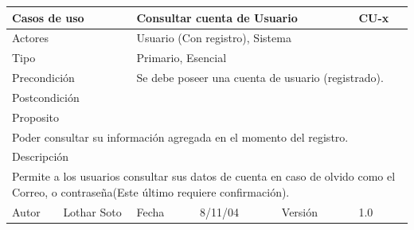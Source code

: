 \documentclass{article}
\begin{document}
\begin{table}[h]
\begin{tabular}{|l|l|l|l|l|l|}
\hline
\multicolumn{2}{|p{2cm}|}{Casos de uso}  & \multicolumn{3}{p{7cm}|}{Consultar cuenta de Usuario} & CU-x \\
\hline
\multicolumn{2}{|p{2cm}|}{Actores}       & \multicolumn{4}{p{8cm}|}{Usuario (Con registro), Sistema}        \\
\hline
\multicolumn{2}{|p{2cm}|}{Tipo}          & \multicolumn{4}{p{8cm}|}{Primario, Esencial}        \\
\hline
\multicolumn{2}{|p{2cm}|}{Precondición}  & \multicolumn{4}{p{8cm}|}{Se debe poseer una cuenta de usuario (registrado).}        \\
\hline
\multicolumn{2}{|p{2cm}|}{Postcondición} & \multicolumn{4}{p{8cm}|}{}        \\
\hline
\multicolumn{6}{|p{10cm}|}{Proposito}                                   \\
\hline
\multicolumn{6}{|p{10cm}|}{Poder consultar su información agregada en el momento del registro.}                                            \\
\hline
\multicolumn{6}{|p{10cm}|}{Descripción}                                 \\
\hline
\multicolumn{6}{|p{10cm}|}{Permite a los usuarios consultar sus datos de cuenta en caso de olvido como el Correo, o contraseña(Este último requiere confirmación).}                                            \\
\hline
Autor             &     Lothar Soto          & Fecha    &  8/11/04   &   Versión  &1.0\\     
\hline
\end{tabular}
\end{table}
\end{document}
